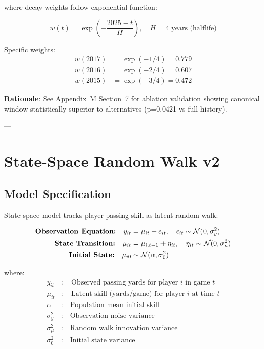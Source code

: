 where decay weights follow exponential function:

\begin{equation}
w(t) = \exp\left(-\frac{2025 - t}{H}\right), \quad H = 4 \text{ years (halflife)}
\label{eq:decay-function}
\end{equation}

Specific weights:
\begin{align}
w(2017) &= \exp(-1/4) = 0.779 \\
w(2016) &= \exp(-2/4) = 0.607 \\
w(2015) &= \exp(-3/4) = 0.472
\end{align}

\textbf{Rationale}: See Appendix~M Section~7 for ablation validation showing canonical window statistically superior to alternatives (p=0.0421 vs full-history).

---

\section{State-Space Random Walk v2}

\subsection{Model Specification}

State-space model tracks player passing skill as latent random walk:

\begin{align}
\text{\textbf{Observation Equation:}} \quad y_{it} &= \mu_{it} + \epsilon_{it}, \quad \epsilon_{it} \sim \mathcal{N}(0, \sigma_y^2) \\
\text{\textbf{State Transition:}} \quad \mu_{it} &= \mu_{i,t-1} + \eta_{it}, \quad \eta_{it} \sim \mathcal{N}(0, \sigma_\mu^2) \\
\text{\textbf{Initial State:}} \quad \mu_{i0} &\sim \mathcal{N}(\alpha, \sigma_0^2)
\label{eq:state-space-spec}
\end{align}

where:
\begin{align}
y_{it} &: \quad \text{Observed passing yards for player } i \text{ in game } t \\
\mu_{it} &: \quad \text{Latent skill (yards/game) for player } i \text{ at time } t \\
\alpha &: \quad \text{Population mean initial skill} \\
\sigma_y^2 &: \quad \text{Observation noise variance} \\
\sigma_\mu^2 &: \quad \text{Random walk innovation variance} \\
\sigma_0^2 &: \quad \text{Initial state variance}
\end{align}

